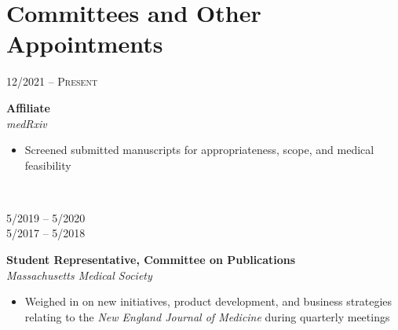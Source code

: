 \documentclass{article}
\newcommand\colleft{.20}
\newcommand\colright{.75}
\newcommand{\entryfour}[4]
	{
		\begin{minipage}[t]{\colleft\textwidth}
		\hfill \textsc{#1}
		\end{minipage}
		\hfill\vline\hfill
		\begin{minipage}[t]{\colright\textwidth}
		{\bf#2}\\
		\textit{#3}
		\footnotesize{#4}
		\end{minipage}\\
		\entryvspace
	}%
\newcommand{\entryvspace}{\vspace{0.5em}}
\begin{document}
	

	\section*{Committees and Other Appointments}
		\entryfour{12/2021 -- Present}{Affiliate}{medRxiv}{%
			\begin{itemize}
				\item Screened submitted manuscripts for appropriateness, scope, and medical feasibility
		\end{itemize}
		}


\begin{minipage}[t]{\colleft\textwidth}
	\vspace{0.1pc}
	\begin{flushright}
		5/2019 -- 5/2020\\
		5/2017 -- 5/2018
	\end{flushright}
\end{minipage}
\hfill\vline\hfill
\begin{minipage}[t]{\colright\textwidth}
	{\bf Student Representative, Committee on Publications}\\
	\textit{Massachusetts Medical Society}
	\footnotesize{%
		\begin{itemize}
			\item  Weighed in on new initiatives, product development, and business strategies relating to the \emph{New England Journal of Medicine} during quarterly meetings
		\end{itemize}
	}
\end{minipage}
\entryvspace
\end{document}
